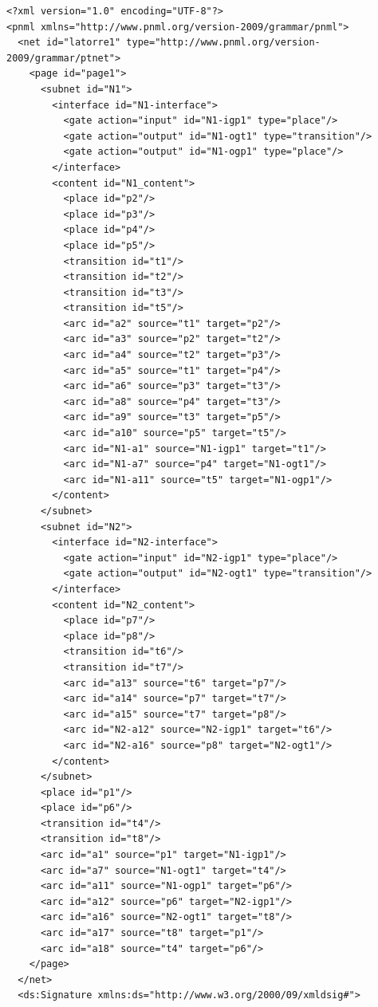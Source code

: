 \begin{lstlisting}[basicstyle=\ttfamily\tiny]
<?xml version="1.0" encoding="UTF-8"?>
<pnml xmlns="http://www.pnml.org/version-2009/grammar/pnml">
  <net id="latorre1" type="http://www.pnml.org/version-2009/grammar/ptnet">
    <page id="page1">
      <subnet id="N1">
        <interface id="N1-interface">
          <gate action="input" id="N1-igp1" type="place"/>
          <gate action="output" id="N1-ogt1" type="transition"/>
          <gate action="output" id="N1-ogp1" type="place"/>
        </interface>
        <content id="N1_content">
          <place id="p2"/>
          <place id="p3"/>
          <place id="p4"/>
          <place id="p5"/>
          <transition id="t1"/>
          <transition id="t2"/>
          <transition id="t3"/>
          <transition id="t5"/>
          <arc id="a2" source="t1" target="p2"/>
          <arc id="a3" source="p2" target="t2"/>
          <arc id="a4" source="t2" target="p3"/>
          <arc id="a5" source="t1" target="p4"/>
          <arc id="a6" source="p3" target="t3"/>
          <arc id="a8" source="p4" target="t3"/>
          <arc id="a9" source="t3" target="p5"/>
          <arc id="a10" source="p5" target="t5"/>
          <arc id="N1-a1" source="N1-igp1" target="t1"/>
          <arc id="N1-a7" source="p4" target="N1-ogt1"/>
          <arc id="N1-a11" source="t5" target="N1-ogp1"/>
        </content>
      </subnet>
      <subnet id="N2">
        <interface id="N2-interface">
          <gate action="input" id="N2-igp1" type="place"/>
          <gate action="output" id="N2-ogt1" type="transition"/>
        </interface>
        <content id="N2_content">
          <place id="p7"/>
          <place id="p8"/>
          <transition id="t6"/>
          <transition id="t7"/>
          <arc id="a13" source="t6" target="p7"/>
          <arc id="a14" source="p7" target="t7"/>
          <arc id="a15" source="t7" target="p8"/>
          <arc id="N2-a12" source="N2-igp1" target="t6"/>
          <arc id="N2-a16" source="p8" target="N2-ogt1"/>
        </content>
      </subnet>
      <place id="p1"/>
      <place id="p6"/>
      <transition id="t4"/>
      <transition id="t8"/>
      <arc id="a1" source="p1" target="N1-igp1"/>
      <arc id="a7" source="N1-ogt1" target="t4"/>
      <arc id="a11" source="N1-ogp1" target="p6"/>
      <arc id="a12" source="p6" target="N2-igp1"/>
      <arc id="a16" source="N2-ogt1" target="t8"/>
      <arc id="a17" source="t8" target="p1"/>
      <arc id="a18" source="t4" target="p6"/>
    </page>
  </net>
  <ds:Signature xmlns:ds="http://www.w3.org/2000/09/xmldsig#">

\end{lstlisting}
